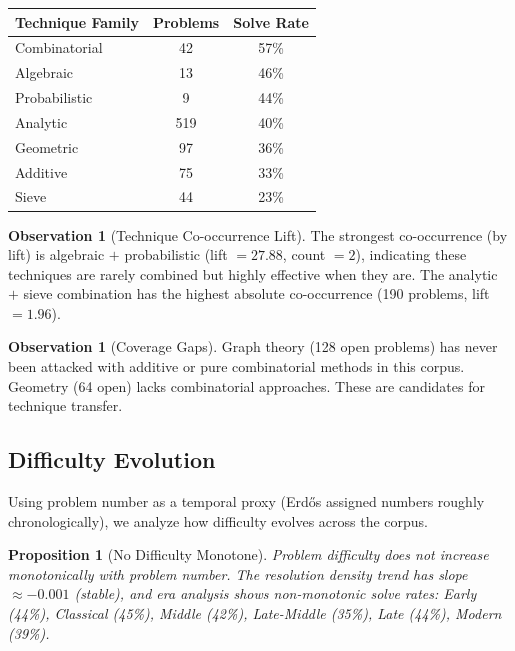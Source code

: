 \documentclass[11pt,a4paper]{article}
\newtheorem{proposition}[theorem]{Proposition}
\theoremstyle{definition}
\newtheorem{observation}[theorem]{Observation}
\theoremstyle{remark}
\begin{document}
\begin{center}
\begin{tabular}{lcc}
\toprule
Technique Family & Problems & Solve Rate \\
\midrule
Combinatorial & 42 & 57\% \\
Algebraic & 13 & 46\% \\
Probabilistic & 9 & 44\% \\
Analytic & 519 & 40\% \\
Geometric & 97 & 36\% \\
Additive & 75 & 33\% \\
Sieve & 44 & 23\% \\
\bottomrule
\end{tabular}
\end{center}

\begin{observation}[Technique Co-occurrence Lift]
The strongest co-occurrence (by lift) is algebraic $+$ probabilistic
(lift $= 27.88$, count $= 2$), indicating these techniques are rarely combined
but highly effective when they are. The analytic $+$ sieve combination has
the highest absolute co-occurrence (190 problems, lift $= 1.96$).
\end{observation}

\begin{observation}[Coverage Gaps]
Graph theory (128 open problems) has never been attacked with additive or
pure combinatorial methods in this corpus. Geometry (64 open) lacks
combinatorial approaches. These are candidates for technique transfer.
\end{observation}

\subsection{Difficulty Evolution}

Using problem number as a temporal proxy (Erd\H{o}s assigned numbers roughly
chronologically), we analyze how difficulty evolves across the corpus.

\begin{proposition}[No Difficulty Monotone]
Problem difficulty does \emph{not} increase monotonically with problem number.
The resolution density trend has slope $\approx -0.001$ (stable), and era
analysis shows non-monotonic solve rates: Early (44\%), Classical (45\%),
Middle (42\%), Late-Middle (35\%), Late (44\%), Modern (39\%).
\end{proposition}
\end{document}
